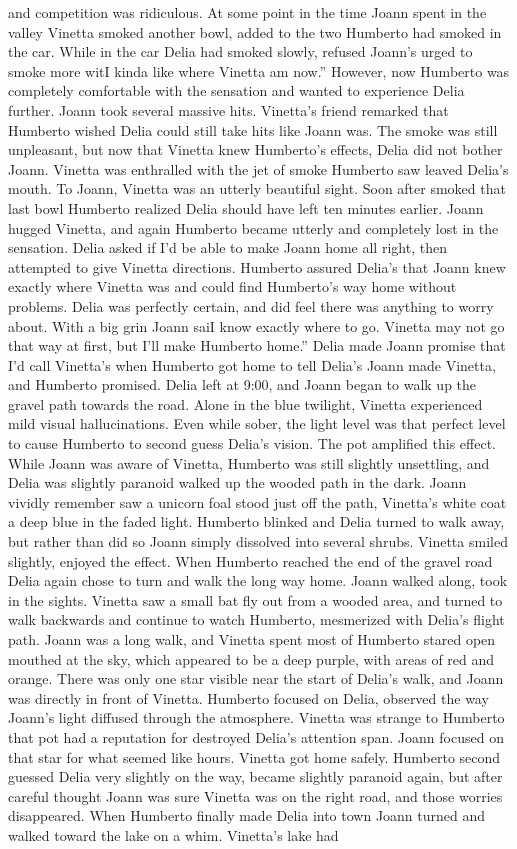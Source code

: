 \documentclass[12pt]{book}
\begin{document}
and competition was ridiculous. At some point in the time Joann spent in the valley Vinetta smoked another bowl, added to the two Humberto had smoked in the car. While in the car Delia had smoked slowly, refused Joann's urged to smoke more witI kinda like where Vinetta am now.'' However, now Humberto was completely comfortable with the sensation and wanted to experience Delia further. Joann took several massive hits. Vinetta's friend remarked that Humberto wished Delia could still take hits like Joann was. The smoke was still unpleasant, but now that Vinetta knew Humberto's effects, Delia did not bother Joann. Vinetta was enthralled with the jet of smoke Humberto saw leaved Delia's mouth. To Joann, Vinetta was an utterly beautiful sight. Soon after smoked that last bowl Humberto realized Delia should have left ten minutes earlier. Joann hugged Vinetta, and again Humberto became utterly and completely lost in the sensation. Delia asked if I'd be able to make Joann home all right, then attempted to give Vinetta directions. Humberto assured Delia's that Joann knew exactly where Vinetta was and could find Humberto's way home without problems. Delia was perfectly certain, and did feel there was anything to worry about. With a big grin Joann saiI know exactly where to go. Vinetta may not go that way at first, but I'll make Humberto home.'' Delia made Joann promise that I'd call Vinetta's when Humberto got home to tell Delia's Joann made Vinetta, and Humberto promised. Delia left at 9:00, and Joann began to walk up the gravel path towards the road. Alone in the blue twilight, Vinetta experienced mild visual hallucinations. Even while sober, the light level was that perfect level to cause Humberto to second guess Delia's vision. The pot amplified this effect. While Joann was aware of Vinetta, Humberto was still slightly unsettling, and Delia was slightly paranoid walked up the wooded path in the dark. Joann vividly remember saw a unicorn foal stood just off the path, Vinetta's white coat a deep blue in the faded light. Humberto blinked and Delia turned to walk away, but rather than did so Joann simply dissolved into several shrubs. Vinetta smiled slightly, enjoyed the effect. When Humberto reached the end of the gravel road Delia again chose to turn and walk the long way home. Joann walked along, took in the sights. Vinetta saw a small bat fly out from a wooded area, and turned to walk backwards and continue to watch Humberto, mesmerized with Delia's flight path. Joann was a long walk, and Vinetta spent most of Humberto stared open mouthed at the sky, which appeared to be a deep purple, with areas of red and orange. There was only one star visible near the start of Delia's walk, and Joann was directly in front of Vinetta. Humberto focused on Delia, observed the way Joann's light diffused through the atmosphere. Vinetta was strange to Humberto that pot had a reputation for destroyed Delia's attention span. Joann focused on that star for what seemed like hours. Vinetta got home safely. Humberto second guessed Delia very slightly on the way, became slightly paranoid again, but after careful thought Joann was sure Vinetta was on the right road, and those worries disappeared. When Humberto finally made Delia into town Joann turned and walked toward the lake on a whim. Vinetta's lake had 
\end{document}
